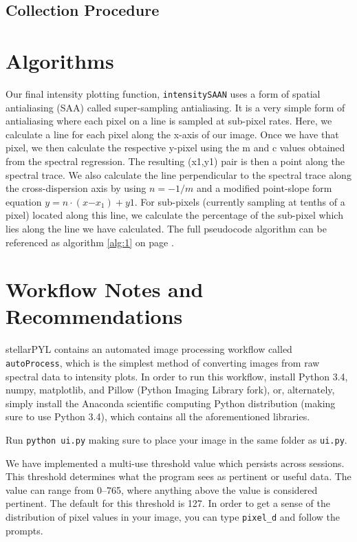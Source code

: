 \documentclass[prb,preprint]{revtex4-1}
\begin{document}
	\subsection{Collection Procedure}
\section{Algorithms}
	Our final intensity plotting function, \verb|intensitySAAN| uses a form of spatial antialiasing (SAA) called super-sampling antialiasing. It is a very simple form of antialiasing where each pixel on a line is sampled at sub-pixel rates. Here, we calculate a line for each pixel along the x-axis of our image. Once we have that pixel, we then calculate the respective y-pixel using the m and c values obtained from the spectral regression. The resulting (x1,y1) pair is then a point along the spectral trace. We also calculate the line perpendicular to the spectral trace along the cross-dispersion axis by using $n = -1/m$ and a modified point-slope form equation $y = n \cdot (x \mathbb{-} x_1) + y1$. For sub-pixels (currently sampling at tenths of a pixel) located along this line, we calculate the percentage of the sub-pixel which lies along the line we have calculated. The full pseudocode algorithm can be referenced as algorithm \ref{alg:1} on page \pageref{alg:1}.
	
\section{Workflow Notes and Recommendations}
	stellarPYL contains an automated image processing workflow called \verb|autoProcess|, which is the simplest method of converting images from raw spectral data to intensity plots. In order to run this workflow, install Python 3.4, numpy, matplotlib, and Pillow (Python Imaging Library fork), or, alternately, simply install the Anaconda scientific computing Python distribution (making sure to use Python 3.4), which contains all the aforementioned libraries.
	
	Run \verb|python ui.py| making sure to place your image in the same folder as \verb|ui.py|. 
	
	We have implemented a multi-use threshold value which persists across sessions. This threshold determines what the program sees as pertinent or useful data. The value can range from 0--765, where anything above the value is considered pertinent. The default for this threshold is 127. In order to get a sense of the distribution of pixel values in your image, you can type \verb|pixel_d| and follow the prompts.
	
\end{document}
